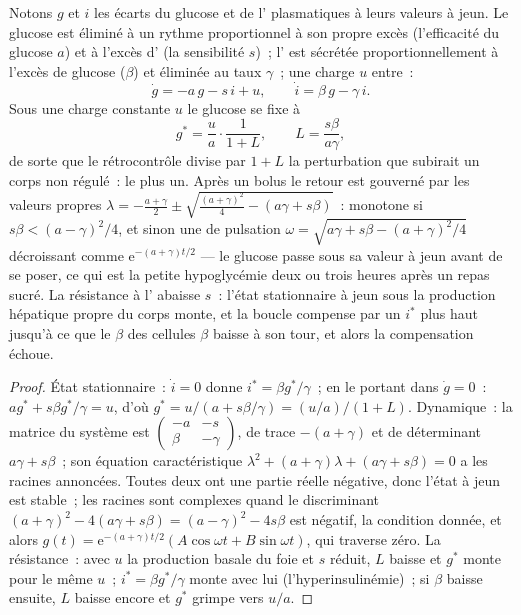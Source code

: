 \begin{theorem}\label{thm:b3:endocrinology:loop}
Notons $g$ et $i$ les écarts du glucose et de l' plasmatiques à
leurs valeurs à jeun. Le glucose est éliminé à un rythme proportionnel à
son propre excès (l'efficacité du glucose $a$) et à l'excès d'
(la sensibilité $s$)~; l' est sécrétée proportionnellement à
l'excès de glucose ($\beta$) et éliminée au taux $\gamma$~; une charge
$u$ entre~:
\[
\dot g = -a\,g - s\,i + u, \qquad \dot i = \beta\,g - \gamma\,i .
\]
Sous une charge constante $u$ le glucose se fixe à
\[
g^{*} = \frac{u}{a}\cdot\frac{1}{1 + L}, \qquad L = \frac{s\beta}{a\gamma},
\]
de sorte que le rétrocontrôle divise par $1 + L$ la perturbation que
subirait un corps non régulé~: le \emph{} plus un. Après
un bolus le retour est gouverné par les valeurs propres
$\lambda = -\tfrac{a + \gamma}{2} \pm \sqrt{\tfrac{(a+\gamma)^{2}}{4} - (a\gamma + s\beta)}$~:
monotone si $s\beta < (a - \gamma)^{2}/4$, et sinon une  de pulsation $\omega = \sqrt{a\gamma + s\beta -
(a+\gamma)^{2}/4}$ décroissant comme $\mathrm{e}^{-(a+\gamma)t/2}$ --- le
glucose passe sous sa valeur à jeun avant de se poser, ce qui est la
petite hypoglycémie deux ou trois heures après un repas sucré. La
résistance à l' abaisse $s$~: l'état stationnaire à jeun sous la
production hépatique propre du corps monte, et la boucle compense par un
$i^{*}$ plus haut jusqu'à ce que le $\beta$ des cellules $\beta$ baisse à
son tour, et alors la compensation échoue.
\end{theorem}
\begin{proof}
État stationnaire~: $\dot i = 0$ donne $i^{*} = \beta g^{*}/\gamma$~; en
le portant dans $\dot g = 0$~: $a g^{*} + s\beta g^{*}/\gamma = u$, d'où
$g^{*} =
u/(a + s\beta/\gamma) = (u/a)/(1 + L)$. Dynamique~: la matrice du
système est
$\begin{pmatrix} -a & -s\\ \beta & -\gamma\end{pmatrix}$, de trace
$-(a+\gamma)$ et de déterminant $a\gamma + s\beta$~; son équation
caractéristique $\lambda^{2} + (a+\gamma)\lambda + (a\gamma + s\beta) = 0$
a les racines annoncées. Toutes deux ont une partie réelle négative,
donc l'état à jeun est stable~; les racines sont complexes quand le
discriminant $(a+\gamma)^{2}
- 4(a\gamma + s\beta) = (a-\gamma)^{2} - 4s\beta$ est négatif, la
condition donnée, et alors $g(t) = \mathrm{e}^{-(a+\gamma)t/2}(A\cos\omega t
+ B\sin\omega t)$, qui traverse zéro. La résistance~: avec $u$ la
production basale du foie et $s$ réduit, $L$ baisse et $g^{*}$ monte pour
le même $u$~; $i^{*} = \beta g^{*}/\gamma$ monte avec lui
(l'hyperinsulinémie)~; si $\beta$ baisse ensuite, $L$ baisse encore et
$g^{*}$ grimpe vers $u/a$.
\end{proof}

